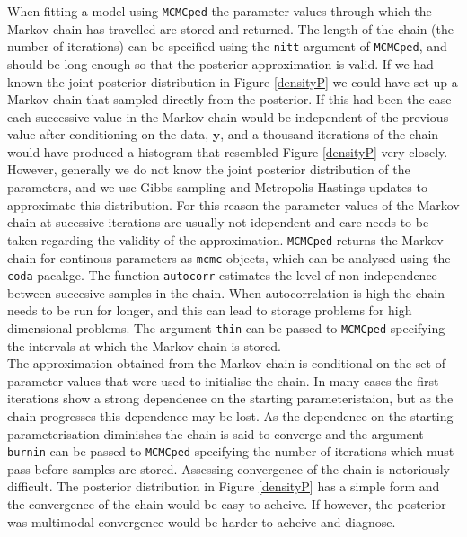 \documentclass{article}
\begin{document}
When fitting a model using \texttt{MCMCped} the parameter values through which the Markov chain has travelled are stored and returned.  The length of the chain (the number of iterations) can be specified using the \texttt{nitt} argument of \texttt{MCMCped}, and should be long enough so that the posterior approximation is valid.  If we had known the joint posterior distribution in Figure \ref{densityP} we could have set up a Markov chain that sampled directly from the posterior.  If this had been the case each successive value in the Markov chain would be independent of the previous value after conditioning on the data, ${\bm y}$, and a thousand iterations of the chain would have produced a histogram that resembled Figure \ref{densityP} very closely.  However, generally we do not know the joint posterior distribution of the parameters, and we use Gibbs sampling and Metropolis-Hastings updates to approximate this distribution. For this reason the parameter values of the Markov chain at sucessive iterations are usually not idependent and care needs to be taken regarding the validity of the approximation.  \texttt{MCMCped} returns the Markov chain for continous parameters as \texttt{mcmc} objects, which can be analysed using the \texttt{coda} pacakge.  The function \texttt{autocorr} estimates the level of non-independence between succesive samples in the chain.  When autocorrelation is high the chain needs to be run for longer, and this can lead to storage problems for high dimensional problems. The argument \texttt{thin} can be passed to \texttt{MCMCped} specifying the intervals at which the Markov chain is stored.\\

The approximation obtained from the Markov chain is conditional on the set of parameter values that were used to initialise the chain.  In many cases the first iterations show a strong dependence on the starting parameteristaion, but as the chain progresses this dependence may be lost.  As the dependence on the starting parameterisation diminishes the chain is said to converge and the argument \texttt{burnin} can be passed to \texttt{MCMCped} specifying the number of iterations which must pass before samples are stored.  Assessing convergence of the chain is notoriously difficult.  The posterior distribution in Figure \ref{densityP} has a simple form and the convergence of the chain would be easy to acheive.  If however, the posterior was multimodal convergence would be harder to acheive and diagnose.\\  
 
\end{document}
